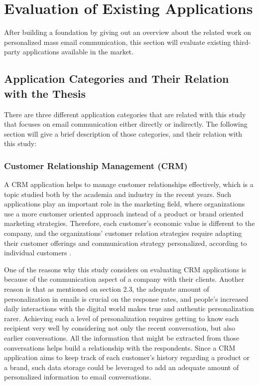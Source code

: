 \chapter{Evaluation of Existing Applications}
\label{chp:3:EvalExisAppl}
After building a foundation by giving out an overview about the related work on personalized mass email communication, this section will evaluate existing third-party applications available in the market. 

\section{Application Categories and Their Relation with the Thesis}
\label{sec:3.1:SystCate}

There are three different application categories that are related with this study that focuses on email communication either directly or indirectly. The following section will give a brief description of those categories, and their relation with this study:

\subsection{Customer Relationship Management (CRM)}
\label{subsec:3.1.1:Cust}
A \ac{CRM} application helps to manage customer relationships effectively, which is a topic studied both by the academia and industry in the recent years. Such applications play an important role in the marketing field, where organizations use a more customer oriented approach instead of a product or brand oriented marketing strategies. Therefore, each customer's economic value is different to the company, and the organizations' customer relation strategies require adapting their customer offerings and communication strategy personalized, according to individual customers \citep{Reinartz2004}. 
\vspace{1cm}

One of the reasons why this study considers on evaluating \ac{CRM} applications is because of the communication aspect of a company with their clients. Another reason is that as mentioned on section 2.3, the adequate amount of personalization in emails is crucial on the response rates, and people's increased daily interactions with the digital world makes true and authentic personalization rarer. Achieving such a level of personalization requires getting to know each recipient very well by considering not only the recent conversation, but also earlier conversations. All the information that might be extracted from those conversations helps build a relationship with the respondents. Since a \ac{CRM} application aims to keep track of each customer's history regarding a product or a brand, such data storage could be leveraged to add an adequate amount of personalized information to email conversations. 

